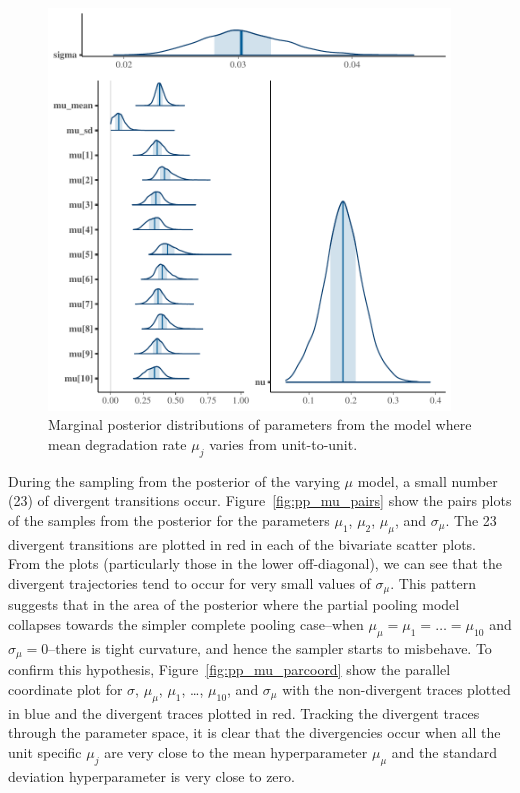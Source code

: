 

\begin{figure}
   \centering
   \includegraphics[width=0.95\textwidth]{./figures/ch-5/plot-pp-mu-marg-post-1.pdf}
   \caption{Marginal posterior distributions of parameters from the model where mean degradation rate $\mu_j$ varies from unit-to-unit.}
   \label{fig:pp_mu_marg} 
\end{figure}

During the sampling from the posterior of the varying $\mu$ model, a small number (23) of divergent transitions occur. Figure~\ref{fig:pp_mu_pairs} show the pairs plots of the samples from the posterior for the parameters $\mu_1$, $\mu_2$, $\mu_\mu$, and $\sigma_\mu$. The 23 divergent transitions are plotted in red in each of the bivariate scatter plots. From the plots (particularly those in the lower off-diagonal), we can see that the divergent trajectories tend to occur for very small values of $\sigma_\mu$. This pattern suggests that in the area of the posterior where the partial pooling model collapses towards the simpler complete pooling case--when $\mu_\mu = \mu_1 = \ldots = \mu_{10}$ and $\sigma_\mu = 0$--there is tight curvature, and hence the sampler starts to misbehave. To confirm this hypothesis, Figure~\ref{fig:pp_mu_parcoord} show the parallel coordinate plot for $\sigma$, $\mu_\mu$, $\mu_1$, \ldots, $\mu_{10}$, and $\sigma_\mu$ with the non-divergent traces plotted in blue and the divergent traces plotted in red. Tracking the divergent traces through the parameter space, it is clear that the divergencies occur when all the unit specific $\mu_j$ are very close to the mean hyperparameter $\mu_\mu$ and the standard deviation hyperparameter is very close to zero.

